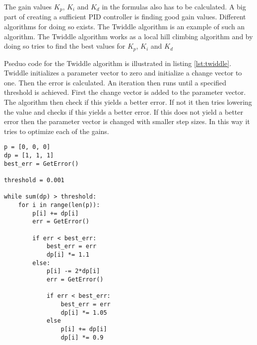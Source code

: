 
\FloatBarrier


The gain values $K_p$, $K_i$ and $K_d$ in the formulas also has to be calculated. A big part of creating a sufficient PID controller is finding good gain values. Different algorithms for doing so exists. The Twiddle algorithm is an example of such an algorithm. The Twiddle algorithm works as a local hill climbing algorithm and by doing so tries to find the best values for $K_p$, $K_i$ and $K_d$

Pseduo code for the Twiddle algorithm is illustrated in listing \ref{lst:twiddle}. Twiddle initializes a parameter vector to zero and initialize a change vector to one.  Then the error is calculated. An iteration then runs until a specified threshold is achieved. First the change vector is added to the parameter vector. The algorithm then check if this yields a better error. If not it then tries lowering the value and checks if this yields a better error. If this does not yield a better error then the parameter vector is changed with smaller step sizes.  In this way it tries to optimize each of the gains.

\newpage

\begin{lstlisting}[caption={Pseduo code for Twiddle}, label=lst:twiddle, mathescape=true]
p = [0, 0, 0]
dp = [1, 1, 1]
best_err = GetError()

threshold = 0.001

while sum(dp) > threshold:
	for i in range(len(p)):
		p[i] += dp[i]
		err = GetError()
		
		if err < best_err: 
			best_err = err
			dp[i] *= 1.1
		else: 
			p[i] -= 2*dp[i]
			err = GetError()
		
			if err < best_err:
				best_err = err
				dp[i] *= 1.05
			else 
				p[i] += dp[i]
				dp[i] *= 0.9
	\end{lstlisting}
\citep{feedbackSystem}